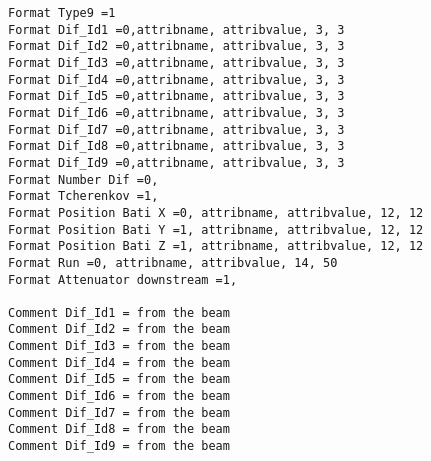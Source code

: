 {\begin{lstlisting}[breaklines=true,basicstyle=\tiny,postbreak=\mbox{\textcolor{red}{$\hookrightarrow$}\space},]
Format Type9 =1
Format Dif_Id1 =0,attribname, attribvalue, 3, 3
Format Dif_Id2 =0,attribname, attribvalue, 3, 3
Format Dif_Id3 =0,attribname, attribvalue, 3, 3
Format Dif_Id4 =0,attribname, attribvalue, 3, 3
Format Dif_Id5 =0,attribname, attribvalue, 3, 3
Format Dif_Id6 =0,attribname, attribvalue, 3, 3
Format Dif_Id7 =0,attribname, attribvalue, 3, 3
Format Dif_Id8 =0,attribname, attribvalue, 3, 3
Format Dif_Id9 =0,attribname, attribvalue, 3, 3
Format Number Dif =0,
Format Tcherenkov =1,
Format Position Bati X =0, attribname, attribvalue, 12, 12
Format Position Bati Y =1, attribname, attribvalue, 12, 12
Format Position Bati Z =1, attribname, attribvalue, 12, 12
Format Run =0, attribname, attribvalue, 14, 50
Format Attenuator downstream =1,

Comment Dif_Id1 = from the beam
Comment Dif_Id2 = from the beam
Comment Dif_Id3 = from the beam
Comment Dif_Id4 = from the beam
Comment Dif_Id5 = from the beam
Comment Dif_Id6 = from the beam
Comment Dif_Id7 = from the beam
Comment Dif_Id8 = from the beam
Comment Dif_Id9 = from the beam


\end{lstlisting}}
